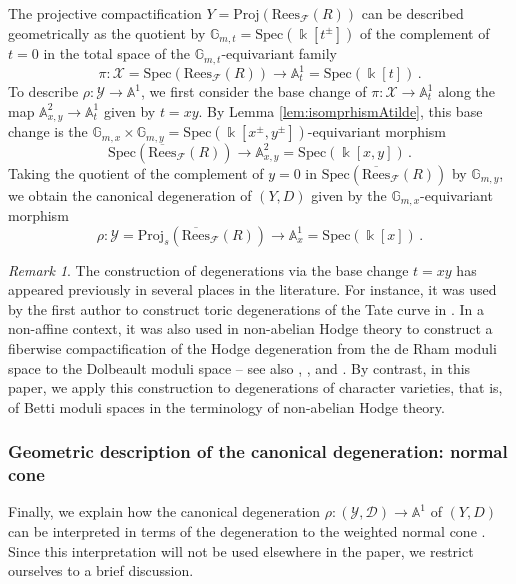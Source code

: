 \documentclass[12pt,letterpaper, reqno]{amsart}
\theoremstyle{defstyle} \newtheorem{definition}[theorem]{Definition}
\theoremstyle{remark}
\newtheorem{remark}[theorem]{Remark}
\numberwithin{equation}{section}
\numberwithin{figure}{section}
\newcommand{\cF} {\mathcal{F}}
\newcommand{\Spec} {\mathrm{Spec}}
\newcommand{\Proj} {\mathrm{Proj}}
\newcommand{\kk} {\Bbbk}
\newcommand{\A} {\mathbb{A}}
\newcommand{\G} {\mathbb{G}}
\newcommand{\cY} {\mathcal{Y}}
\newcommand{\cX} {\mathcal{X}}
\begin{document}
The projective compactification $Y=\Proj(\mathrm{Rees}_\cF(R))$ can be described geometrically as the 
quotient by $\G_{m,t}=\Spec(\kk[t^\pm])$ of the complement of $t=0$ in the total space of the $\G_{m,t}$-equivariant family
\[ \pi: \cX = \Spec(\mathrm{Rees}_\cF(R)) \longrightarrow \A^1_t =\Spec(\kk[t])\,.\]
To describe $\rho: \cY \rightarrow \A^1$, we first consider the base change 
of $\pi: \cX \rightarrow \A^1_t$ along the map $\A^2_{x,y} \rightarrow \A^1_t$ given by $t=xy$. 
By Lemma \ref{lem:isomprhismAtilde}, this base change is the 
 $\mathbb{G}_{m,x} \times \mathbb{G}_{m,y} = \Spec(\kk[x^{\pm}, y^{\pm}])$-equivariant morphism 
\[ \Spec(\overline{\mathrm{Rees}}_\cF(R)) \longrightarrow \mathbb{A}^2_{x,y} = \Spec(\kk[x,y])  \,. \]
Taking the quotient of the complement of $y = 0$ in $\Spec(\overline{\mathrm{Rees}}_\cF(R))$ 
by $\mathbb{G}_{m,y}$, we obtain the canonical degeneration of $(Y,D)$ 
given by the $\mathbb{G}_{m,x}$-equivariant morphism
\[ \rho: \cY = \Proj_s (\overline{\mathrm{Rees}}_\cF(R)) \longrightarrow \mathbb{A}^1_x = \Spec(\kk [x]) \,.  \]



\begin{remark}
The construction of degenerations via the base change $t=xy$ 
has appeared previously in several places in the literature.
For instance, it was used by the first author to construct toric degenerations of the Tate curve in \cite[Theorem 3.2]{Arguzcorals}. In a non-affine context, it was also used in non-abelian Hodge theory to construct a fiberwise compactification of the Hodge degeneration from the de Rham moduli space to the Dolbeault moduli space \cite{hausel_compactification, simpson_hodge} -- see also \cite[Lemma 6.1]{HT2003}, \cite[Theorem 7.2.1]{HLRV2011}, and \cite[Theorem 3.2]{FM2022}. 
By contrast, in this paper, we apply this construction to degenerations of character varieties, that is, of Betti moduli spaces in the terminology of non-abelian Hodge theory.
\end{remark}

\subsubsection{Geometric description of the canonical degeneration: normal cone} \label{sec_normal_cone}

Finally, we explain how the canonical degeneration
$\rho \colon (\mathcal Y,\mathcal D)\longrightarrow \A^1$
of \((Y,D)\) can be interpreted in terms of the degeneration to the weighted normal cone \cite[\S 5.1]{fultonbook}. Since this interpretation will not be used elsewhere in the paper, we restrict ourselves to a brief discussion.
\end{document}
